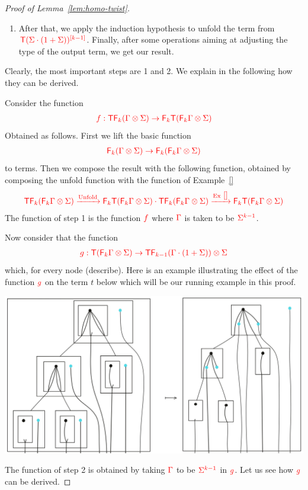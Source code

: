\begin{proof}[Proof of Lemma~\ref{lem:homo-twist}]
\begin{enumerate}
\begin{center}
\end{center}
\item After that, we apply the induction hypothesis to unfold the term from $\ranked{\tmonad\mati {k-1} {(\Sigma\cdot(1+\Sigma))}}$. Finally, after some operations aiming at adjusting the type of the output term, we get our result.
\end{enumerate}
Clearly, the most important steps are 1 and 2. We explain in the following how they can be derived. 

Consider the function 
\begin{align*}
\ranked{f:\tmonad \reduce k (\Gamma\otimes \Sigma)\to \reduce k \tmonad(\reduce k \Gamma\otimes \Sigma)}
\end{align*}
Obtained as follows. First we lift the basic function
\begin{align*}
\ranked { \reduce k (\Gamma\otimes \Sigma) \to  \reduce k (\reduce k \Gamma\otimes \Sigma)}
\end{align*}
to terms. Then we compose the result with the following function, obtained by composing the unfold function with the function of Example~\ref{}
\begin{align*}
 \ranked{\tmonad \reduce k (\reduce k \Gamma\otimes \Sigma) \xrightarrow{\text{Unfold}}
 \reduce k \tmonad (\reduce k \Gamma\otimes \Sigma)\cdot \tmonad \reduce k (\reduce k \Gamma\otimes \Sigma) \xrightarrow{\text{Ex}~\ref{}} \reduce k \tmonad (\reduce k \Gamma\otimes \Sigma)}
\end{align*}
The function of step 1 is the function $\ranked{f}$ where $\ranked{\Gamma}$ is taken to be $\ranked{\Sigma^{k-1}}$.



Now consider that the function
\begin{align*}
\ranked{g:\tmonad (\reduce k \Gamma \otimes \Sigma) \to \tmonad \reduce {k-1} (\Gamma\cdot(1+\Sigma))\otimes \Sigma}
\end{align*}
which, for every node (describe). Here is an example illustrating the effect of the function $\ranked{g}$ on the term $t$ below which will be our running example in this proof.
\begin{center}
\includegraphics[scale=.12]{MyPic22.jpg}
\end{center}
The function of step 2 is obtained by taking $\ranked{\Gamma}$ to be $\ranked{\Sigma^{k-1}}$ in $\ranked{g}$. Let us see how $\ranked{g}$ can be derived.


\end{proof}
